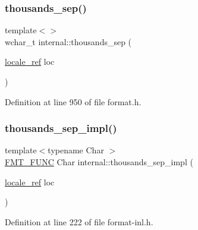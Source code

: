 \subsubsection{\texorpdfstring{thousands\+\_\+sep()}{thousands\_sep()}\hspace{0.1cm}{\footnotesize\ttfamily [2/2]}}
{\footnotesize\ttfamily template$<$$>$ \\
wchar\+\_\+t internal\+::thousands\+\_\+sep (\begin{DoxyParamCaption}\item[{\hyperlink{classinternal_1_1locale__ref}{locale\+\_\+ref}}]{loc }\end{DoxyParamCaption})\hspace{0.3cm}{\ttfamily [inline]}}



Definition at line 950 of file format.\+h.

\mbox{\label{namespaceinternal_a70aa19597fbb8bad857a307b17c6b478}} 
\subsubsection{\texorpdfstring{thousands\+\_\+sep\+\_\+impl()}{thousands\_sep\_impl()}\hspace{0.1cm}{\footnotesize\ttfamily [1/2]}}
{\footnotesize\ttfamily template$<$typename Char $>$ \\
\hyperlink{format_8h_a02c8898388e0ae59aab58be14fcd4e05}{F\+M\+T\+\_\+\+F\+U\+NC} Char internal\+::thousands\+\_\+sep\+\_\+impl (\begin{DoxyParamCaption}\item[{\hyperlink{classinternal_1_1locale__ref}{locale\+\_\+ref}}]{loc }\end{DoxyParamCaption})}



Definition at line 222 of file format-\/inl.\+h.

